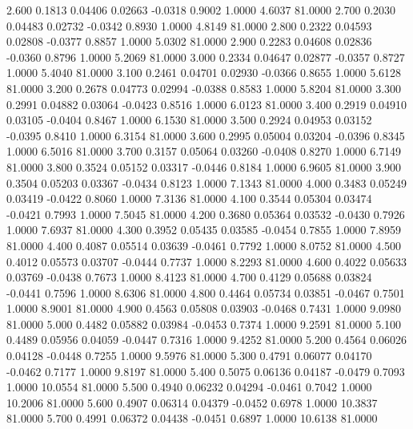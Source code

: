    2.600   0.1813   0.04406   0.02663  -0.0318   0.9002   1.0000   4.6037  81.0000
   2.700   0.2030   0.04483   0.02732  -0.0342   0.8930   1.0000   4.8149  81.0000
   2.800   0.2322   0.04593   0.02808  -0.0377   0.8857   1.0000   5.0302  81.0000
   2.900   0.2283   0.04608   0.02836  -0.0360   0.8796   1.0000   5.2069  81.0000
   3.000   0.2334   0.04647   0.02877  -0.0357   0.8727   1.0000   5.4040  81.0000
   3.100   0.2461   0.04701   0.02930  -0.0366   0.8655   1.0000   5.6128  81.0000
   3.200   0.2678   0.04773   0.02994  -0.0388   0.8583   1.0000   5.8204  81.0000
   3.300   0.2991   0.04882   0.03064  -0.0423   0.8516   1.0000   6.0123  81.0000
   3.400   0.2919   0.04910   0.03105  -0.0404   0.8467   1.0000   6.1530  81.0000
   3.500   0.2924   0.04953   0.03152  -0.0395   0.8410   1.0000   6.3154  81.0000
   3.600   0.2995   0.05004   0.03204  -0.0396   0.8345   1.0000   6.5016  81.0000
   3.700   0.3157   0.05064   0.03260  -0.0408   0.8270   1.0000   6.7149  81.0000
   3.800   0.3524   0.05152   0.03317  -0.0446   0.8184   1.0000   6.9605  81.0000
   3.900   0.3504   0.05203   0.03367  -0.0434   0.8123   1.0000   7.1343  81.0000
   4.000   0.3483   0.05249   0.03419  -0.0422   0.8060   1.0000   7.3136  81.0000
   4.100   0.3544   0.05304   0.03474  -0.0421   0.7993   1.0000   7.5045  81.0000
   4.200   0.3680   0.05364   0.03532  -0.0430   0.7926   1.0000   7.6937  81.0000
   4.300   0.3952   0.05435   0.03585  -0.0454   0.7855   1.0000   7.8959  81.0000
   4.400   0.4087   0.05514   0.03639  -0.0461   0.7792   1.0000   8.0752  81.0000
   4.500   0.4012   0.05573   0.03707  -0.0444   0.7737   1.0000   8.2293  81.0000
   4.600   0.4022   0.05633   0.03769  -0.0438   0.7673   1.0000   8.4123  81.0000
   4.700   0.4129   0.05688   0.03824  -0.0441   0.7596   1.0000   8.6306  81.0000
   4.800   0.4464   0.05734   0.03851  -0.0467   0.7501   1.0000   8.9001  81.0000
   4.900   0.4563   0.05808   0.03903  -0.0468   0.7431   1.0000   9.0980  81.0000
   5.000   0.4482   0.05882   0.03984  -0.0453   0.7374   1.0000   9.2591  81.0000
   5.100   0.4489   0.05956   0.04059  -0.0447   0.7316   1.0000   9.4252  81.0000
   5.200   0.4564   0.06026   0.04128  -0.0448   0.7255   1.0000   9.5976  81.0000
   5.300   0.4791   0.06077   0.04170  -0.0462   0.7177   1.0000   9.8197  81.0000
   5.400   0.5075   0.06136   0.04187  -0.0479   0.7093   1.0000  10.0554  81.0000
   5.500   0.4940   0.06232   0.04294  -0.0461   0.7042   1.0000  10.2006  81.0000
   5.600   0.4907   0.06314   0.04379  -0.0452   0.6978   1.0000  10.3837  81.0000
   5.700   0.4991   0.06372   0.04438  -0.0451   0.6897   1.0000  10.6138  81.0000
